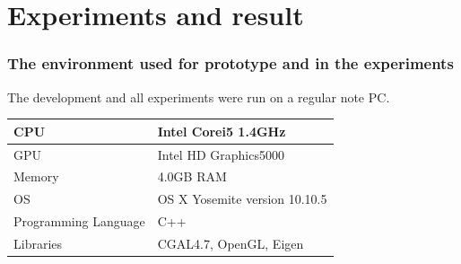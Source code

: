 \documentclass{beamer}
\begin{document}
\section{Experiments and result}

\begin{frame}
\frametitle{The environment used for prototype and in the experiments}
\Large
The development and all experiments were run on a regular note PC. \\
\begin{table}
\begin{center}
\begin{tabular}{|p{3cm}|p{7cm}|} 
\hline
CPU & Intel Corei5 1.4GHz \\ 
\hline
GPU & Intel HD Graphics5000 \\ 
\hline
Memory & 4.0GB RAM \\ 
\hline
OS & OS X Yosemite version 10.10.5 \\  
\hline
Programming Language & C++ \\
\hline 
Libraries & CGAL4.7, OpenGL, Eigen \\ 
\hline
\end{tabular}
\end{center}
\end{table}

\end{frame}
\end{document}
